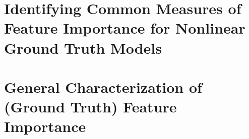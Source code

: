 \documentclass[mnsc,blindrev]{informs3}
\begin{document}


          
         


\section{Identifying Common Measures of Feature Importance for Nonlinear Ground Truth Models}
\label{sec:general_case}

\section{General Characterization of (Ground Truth) Feature Importance}
\end{document}
